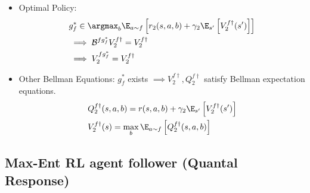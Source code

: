 \documentclass[a4paper,10pt,dvipdfmx]{jsarticle}
\begin{document}
\begin{itemize}
\begin{proof}
        (1) and (2) imply $v(s)=(\mathcal{B}^{f\dag}v)(s)\forall s\implies v(s)=V_2^{f\dag}(s)\forall s$. 
        
        (3) and (4) imply $v(s)=V_2^{f\dag}(s)\forall s \implies v(s)=(\mathcal{B}^{f\dag}v)(s)\forall s$.
        \begin{align}
            \therefore v(s)=V_2^{f\dag}(s)\forall s \iff v(s)=(\mathcal{B}^{f\dag}v)(s)\forall s.
        \end{align}
    \end{proof}
    \item Optimal Policy:
    \begin{align}
        &g_f^* \in \argmax_{b}\E_{a\sim f}\left[r_2(s,a,b)+\gamma_2\E_{s'}\left[V_2^{f\dag}(s')\right]\right]\\
        &\implies \mathcal{B}^{fg_f^*}V_2^{f\dag}=V_2^{f\dag}\\
        &\implies V_2^{fg_f^*}=V_2^{f\dag}
    \end{align}
    \item Other Bellman Equations: $g_f^*$ exists $\implies V_2^{f\dag}, Q_2^{f\dag}$ satisfy Bellman expectation equations.
    \begin{align}
        &Q_2^{f\dag}(s,a,b)=r(s,a,b)+\gamma_2\E_{s'}\left[V_2^{f\dag}(s')\right]\\
        &V_2^{f\dag}(s)=\max_{b}\E_{a\sim f}\left[Q_2^{f\dag}(s,a,b)\right]
    \end{align}
\end{itemize}

\subsection{Max-Ent RL agent follower (Quantal Response)}
\end{document}
